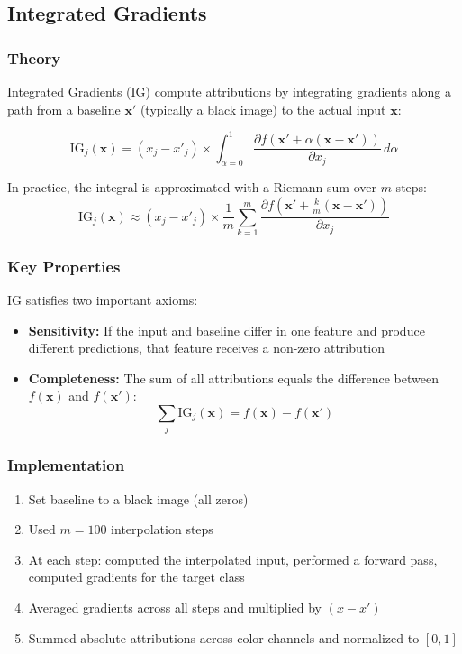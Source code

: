\documentclass[12pt,a4paper]{article}
\begin{document}
\subsection{Integrated Gradients}

\subsubsection{Theory}
Integrated Gradients (IG) compute attributions by integrating gradients along a path from a baseline $\mathbf{x}'$ (typically a black image) to the actual input $\mathbf{x}$:

\begin{equation}
    \text{IG}_j(\mathbf{x}) = (x_j - x'_j) \times \int_{\alpha=0}^{1} \frac{\partial f(\mathbf{x}' + \alpha(\mathbf{x} - \mathbf{x}'))}{\partial x_j} \, d\alpha
\end{equation}

In practice, the integral is approximated with a Riemann sum over $m$ steps:
\begin{equation}
    \text{IG}_j(\mathbf{x}) \approx (x_j - x'_j) \times \frac{1}{m} \sum_{k=1}^{m} \frac{\partial f(\mathbf{x}' + \frac{k}{m}(\mathbf{x} - \mathbf{x}'))}{\partial x_j}
\end{equation}

\subsubsection{Key Properties}
IG satisfies two important axioms:
\begin{itemize}
    \item \textbf{Sensitivity:} If the input and baseline differ in one feature and produce different predictions, that feature receives a non-zero attribution
    \item \textbf{Completeness:} The sum of all attributions equals the difference between $f(\mathbf{x})$ and $f(\mathbf{x}')$:
    \begin{equation}
        \sum_j \text{IG}_j(\mathbf{x}) = f(\mathbf{x}) - f(\mathbf{x}')
    \end{equation}
\end{itemize}

\subsubsection{Implementation}
\begin{enumerate}
    \item Set baseline to a black image (all zeros)
    \item Used $m = 100$ interpolation steps
    \item At each step: computed the interpolated input, performed a forward pass, computed gradients for the target class
    \item Averaged gradients across all steps and multiplied by $(x - x')$
    \item Summed absolute attributions across color channels and normalized to $[0, 1]$
\end{enumerate}
\end{document}
